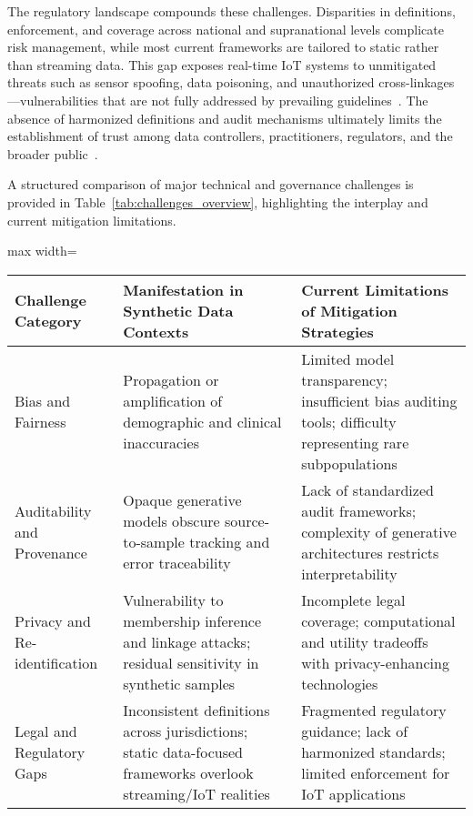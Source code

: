 \documentclass[sigconf]{acmart}
\begin{document}
The regulatory landscape compounds these challenges. Disparities in definitions, enforcement, and coverage across national and supranational levels complicate risk management, while most current frameworks are tailored to static rather than streaming data. This gap exposes real-time IoT systems to unmitigated threats such as sensor spoofing, data poisoning, and unauthorized cross-linkages—vulnerabilities that are not fully addressed by prevailing guidelines~\cite{ref4,ref5,ref10,ref24,ref25,ref30,ref31,ref33,ref34,ref35,ref36,ref41,ref43,ref46,ref50,ref54,ref61,ref62,ref63,ref64,ref65,ref76,ref77,ref82,ref83,ref84,ref91}. The absence of harmonized definitions and audit mechanisms ultimately limits the establishment of trust among data controllers, practitioners, regulators, and the broader public~\cite{ref91}.

A structured comparison of major technical and governance challenges is provided in Table~\ref{tab:challenges_overview}, highlighting the interplay and current mitigation limitations.

\begin{table*}[htbp]
\centering
\caption{Overview of Major Challenges in Synthetic Data for Healthcare and IoT}
\label{tab:challenges_overview}
\begin{adjustbox}{max width=\textwidth}
\begin{tabular}{lll}
\toprule
\textbf{Challenge Category} & \textbf{Manifestation in Synthetic Data Contexts} & \textbf{Current Limitations of Mitigation Strategies} \\
\midrule
Bias and Fairness & Propagation or amplification of demographic and clinical inaccuracies & Limited model transparency; insufficient bias auditing tools; difficulty representing rare subpopulations \\
Auditability and Provenance & Opaque generative models obscure source-to-sample tracking and error traceability & Lack of standardized audit frameworks; complexity of generative architectures restricts interpretability \\
Privacy and Re-identification & Vulnerability to membership inference and linkage attacks; residual sensitivity in synthetic samples & Incomplete legal coverage; computational and utility tradeoffs with privacy-enhancing technologies\\
Legal and Regulatory Gaps & Inconsistent definitions across jurisdictions; static data-focused frameworks overlook streaming/IoT realities & Fragmented regulatory guidance; lack of harmonized standards; limited enforcement for IoT applications \\
\bottomrule
\end{tabular}
\end{adjustbox}
\end{table*}
\end{document}
